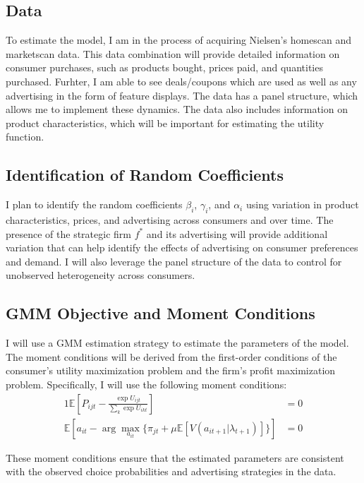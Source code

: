 \documentclass[12pt]{article}
\begin{document}
    \subsection{Data}
    To estimate the model, I am in the process of acquiring Nielsen's homescan and marketscan data. This data combination will provide detailed information on consumer purchases, such as products bought, prices paid, and quantities purchased. Furhter, I am able to see deals/coupons which are used as well as any advertising in the form of feature displays. The data has a panel structure, which allows me to implement these dynamics. The data also includes information on product characteristics, which will be important for estimating the utility function. 

    \subsection{Identification of Random Coefficients}

    I plan to identify the random coefficients $\beta_i$, $\gamma_i$, and $\alpha_i$ using variation in product characteristics, prices, and advertising across consumers and over time. The presence of the strategic firm $f^*$ and its advertising will provide additional variation that can help identify the effects of advertising on consumer preferences and demand. I will also leverage the panel structure of the data to control for unobserved heterogeneity across consumers.

    \subsection{GMM Objective and Moment Conditions}

      I will use a GMM estimation strategy to estimate the parameters of the model. The moment conditions will be derived from the first-order conditions of the consumer's utility maximization problem and the firm's profit maximization problem. Specifically, I will use the following moment conditions:
      \begin{alignat*}{1}
        \mathbb{E}[P_{ijt} - \frac{\exp{U_{ijt}}}{\sum_k\exp{U_{ikt}}}] &= 0 \\
        \mathbb{E}[a_{it} - \arg\max_{a_{it}} \{\pi_{jt} + \mu \mathbb{E}[V(a_{it+1} | \lambda_{t+1})]\}] &= 0
      \end{alignat*}

        These moment conditions ensure that the estimated parameters are consistent with the observed choice probabilities and advertising strategies in the data.
\end{document}

